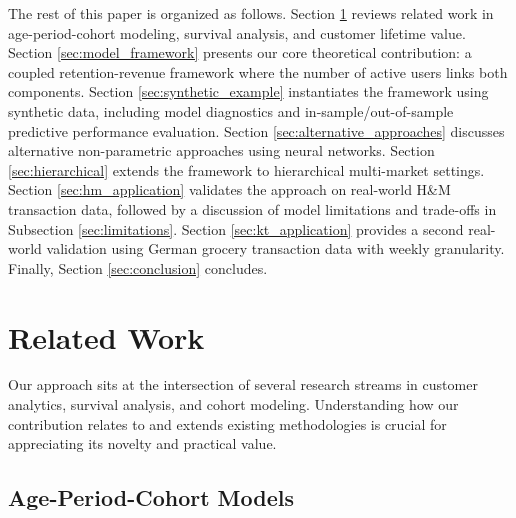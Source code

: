 \documentclass[11pt]{amsart}
\theoremstyle{definition}
\begin{document}
The rest of this paper is organized as follows. Section \ref{sec:related_work} reviews related work in age-period-cohort 
modeling, survival analysis, and customer lifetime value. Section \ref{sec:model_framework} presents our core theoretical 
contribution: a coupled retention-revenue framework where the number of active users links both components. 
Section \ref{sec:synthetic_example} instantiates the framework using synthetic data, including model diagnostics and 
in-sample/out-of-sample predictive performance evaluation.
Section \ref{sec:alternative_approaches} discusses alternative non-parametric approaches using neural networks. 
Section \ref{sec:hierarchical} extends the framework to hierarchical multi-market settings. Section \ref{sec:hm_application} 
validates the approach on real-world H\&M transaction data, followed by a discussion of model limitations and trade-offs in Subsection \ref{sec:limitations}. Section \ref{sec:kt_application} provides a second real-world validation using German grocery transaction data with weekly granularity. Finally, Section \ref{sec:conclusion} concludes.


\section{Related Work}\label{sec:related_work}

Our approach sits at the intersection of several research streams in customer analytics, survival analysis, and cohort
modeling. Understanding how our contribution relates to and extends existing methodologies is crucial for appreciating its
novelty and practical value.

\subsection{Age-Period-Cohort Models}
\end{document}
